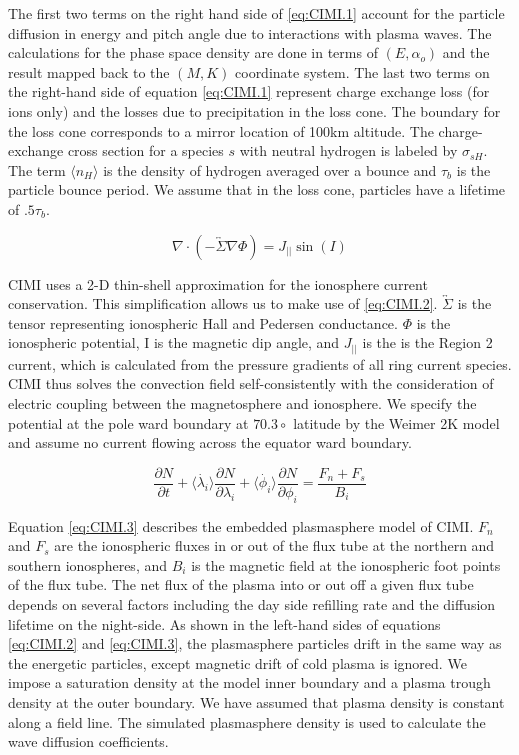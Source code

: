 \documentclass[utf8]{report}
\begin{document}
The first two terms on the right hand side of \ref{eq:CIMI.1} account for the particle diffusion in energy and pitch angle due to interactions with plasma waves. The calculations for the phase space density are done in terms of $(E, \alpha_{o})$ and the result mapped back to the $(M,K)$ coordinate system. The last two terms  on the right-hand side of equation \ref{eq:CIMI.1} represent charge exchange loss (for ions only) and the losses due to precipitation in the loss cone. The boundary for the loss cone corresponds to a mirror location of 100km altitude. The charge-exchange cross section for a species $s$ with neutral hydrogen is labeled by $\sigma_{sH}$. The term $\langle n_{H} \rangle$ is the density of hydrogen averaged over a bounce and $\tau_{b}$ is the particle bounce period. We assume that in the loss cone, particles have a lifetime of $.5\tau_{b}$. 

\begin{equation}
    \nabla \cdot (-\overleftrightarrow{\Sigma}\nabla\Phi) = J_{||} \sin(I)
    \label{eq:CIMI.2}
\end{equation}

CIMI uses a 2-D thin-shell approximation for the ionosphere current conservation. This simplification allows us to make use of \ref{eq:CIMI.2}. $\overleftrightarrow{\Sigma}$ is the tensor representing ionospheric Hall and Pedersen conductance. $\Phi$ is the ionospheric potential, I is the magnetic dip angle, and $J_{||}$ is the is the Region 2 current, which is calculated from the pressure gradients of all ring current species. CIMI thus solves the convection field self-consistently with the consideration of electric coupling between the magnetosphere and ionosphere. We specify the potential at the pole ward boundary at $70.3\circ$ latitude by the Weimer 2K model and assume no current flowing across the equator ward boundary.

\begin{equation}
    \frac{\partial N}{\partial t} + \langle \dot{\lambda_{i}} \rangle \frac{\partial N}{\partial \lambda_{i}} + \langle \dot{\phi_{i}} \rangle \frac{\partial N}{\partial \phi_{i}} = \frac{F_{n} + F_{s}}{B_{i}}
    \label{eq:CIMI.3}
\end{equation}

Equation \ref{eq:CIMI.3} describes the embedded plasmasphere model of CIMI. $F_{n}$ and $F_{s}$ are the ionospheric fluxes in or out of the flux tube at the northern and southern ionospheres, and $B_{i}$ is the magnetic field at the ionospheric foot points of the flux tube. The net flux of the plasma into or out off a given flux tube depends on several factors including the day side refilling rate and the diffusion lifetime on the night-side. As shown in the left-hand sides of equations \ref{eq:CIMI.2} and \ref{eq:CIMI.3}, the plasmasphere particles drift in the same way as the energetic particles, except magnetic drift of cold plasma is ignored. We impose a saturation density at the model inner boundary and a plasma trough density at the outer boundary. We have assumed that plasma density is constant along a field line. The simulated plasmasphere density is used to calculate the wave diffusion coefficients. 
\end{document}
